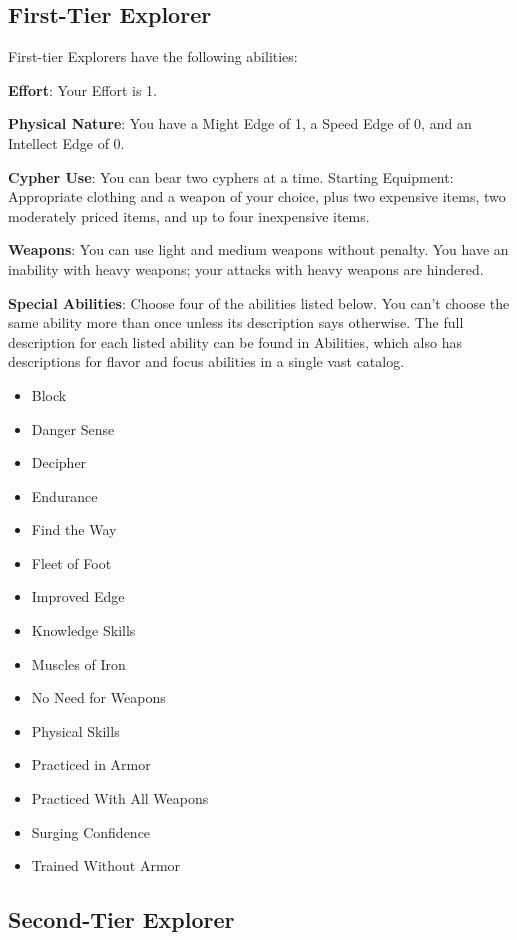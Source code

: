 \subsection{First-Tier Explorer}

First-tier Explorers have the following abilities:

\textbf{Effort}: Your Effort is 1.

\textbf{Physical Nature}: You have a Might Edge of 1, a Speed Edge of 0, and an Intellect Edge of 0.

\textbf{Cypher Use}: You can bear two cyphers at a time.
Starting Equipment: Appropriate clothing and a weapon of your choice, plus two expensive items, two moderately priced items, and up to four inexpensive items.

\textbf{Weapons}: You can use light and medium weapons without penalty. You have an inability with heavy weapons; your attacks with heavy weapons are hindered.

\textbf{Special Abilities}: Choose four of the abilities listed below. You can’t choose the same ability more than once unless its description says otherwise. The full description for each listed ability can be found in Abilities, which also has descriptions for flavor and focus abilities in a single vast catalog.

\begin{itemize}
\item Block
\item Danger Sense
\item Decipher
\item Endurance
\item Find the Way
\item Fleet of Foot
\item Improved Edge
\item Knowledge Skills
\item Muscles of Iron
\item No Need for Weapons
\item Physical Skills
\item Practiced in Armor
\item Practiced With All Weapons
\item Surging Confidence
\item Trained Without Armor
\end{itemize}

\subsection{Second-Tier Explorer}

